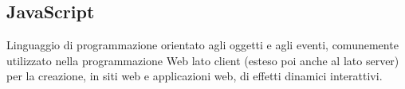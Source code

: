 \documentclass[../glossario.tex]{subfiles}
\begin{document}
\subsection*{JavaScript}
Linguaggio di programmazione orientato agli oggetti e agli eventi, comunemente utilizzato nella programmazione Web lato client (esteso poi anche al lato server) per la creazione, in siti web e applicazioni web, di effetti dinamici interattivi.

    
\end{document}
